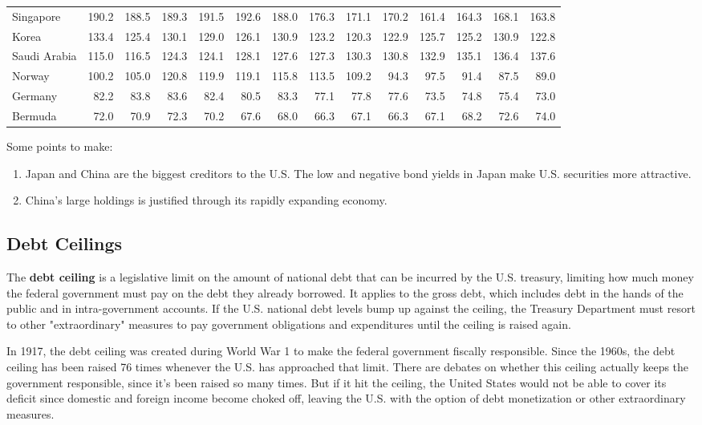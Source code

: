 \documentclass{article}
\begin{document}
\begin{table}[H]
\begin{tabular}{lrrrrrrrrrrrrr}
      Singapore & 190.2 & 188.5 & 189.3 & 191.5 & 192.6 & 188.0 & 176.3 & 171.1 & 170.2 & 161.4 & 164.3 & 168.1 & 163.8 \\
      Korea & 133.4 & 125.4 & 130.1 & 129.0 & 126.1 & 130.9 & 123.2 & 120.3 & 122.9 & 125.7 & 125.2 & 130.9 & 122.8 \\
      Saudi Arabia & 115.0 & 116.5 & 124.3 & 124.1 & 128.1 & 127.6 & 127.3 & 130.3 & 130.8 & 132.9 & 135.1 & 136.4 & 137.6 \\
      Norway & 100.2 & 105.0 & 120.8 & 119.9 & 119.1 & 115.8 & 113.5 & 109.2 & 94.3 & 97.5 & 91.4 & 87.5 & 89.0 \\
      Germany & 82.2 & 83.8 & 83.6 & 82.4 & 80.5 & 83.3 & 77.1 & 77.8 & 77.6 & 73.5 & 74.8 & 75.4 & 73.0 \\
      Bermuda & 72.0 & 70.9 & 72.3 & 70.2 & 67.6 & 68.0 & 66.3 & 67.1 & 66.3 & 67.1 & 68.2 & 72.6 & 74.0 \\
      \hline
      \end{tabular}
    \end{table}

    Some points to make:
    \begin{enumerate}
      \item Japan and China are the biggest creditors to the U.S. The low and negative bond yields in Japan make U.S. securities more attractive.
      \item China's large holdings is justified through its rapidly expanding economy.
    \end{enumerate}

  \subsection{Debt Ceilings}

    The \textbf{debt ceiling} is a legislative limit on the amount of national debt that can be incurred by the U.S. treasury, limiting how much money the federal government must pay on the debt they already borrowed. It applies to the gross debt, which includes debt in the hands of the public and in intra-government accounts. If the U.S. national debt levels bump up against the ceiling, the Treasury Department must resort to other "extraordinary" measures to pay government obligations and expenditures until the ceiling is raised again.

    In 1917, the debt ceiling was created during World War 1 to make the federal government fiscally responsible. Since the 1960s, the debt ceiling has been raised 76 times whenever the U.S. has approached that limit. There are debates on whether this ceiling actually keeps the government responsible, since it's been raised so many times. But if it hit the ceiling, the United States would not be able to cover its deficit since domestic and foreign income become choked off, leaving the U.S. with the option of debt monetization or other extraordinary measures.
\end{document}

